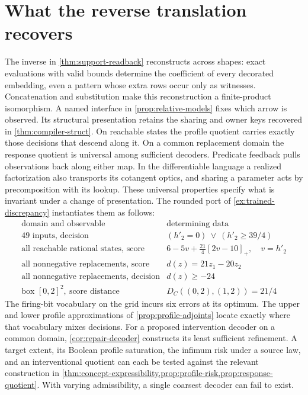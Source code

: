\documentclass[11pt,a4paper]{article}
\theoremstyle{definition}
\theoremstyle{remark}\newaliascnt{remark}{theorem}
\numberwithin{equation}{section}
\begin{document}
\section*{What the reverse translation recovers}
The inverse in \cref{thm:support-readback} reconstructs across shapes: exact evaluations with valid bounds determine the coefficient of every decorated embedding, even a pattern whose extra rows occur only as witnesses. Concatenation and substitution make this reconstruction a finite-product isomorphism. A named interface in \cref{prop:relative-models} fixes which arrow is observed. Its structural presentation retains the sharing and owner keys recovered in \cref{thm:compiler-struct}. On reachable states the profile quotient carries exactly those decisions that descend along it. On a common replacement domain the response quotient is universal among sufficient decoders. Predicate feedback pulls observations back along either map. In the differentiable language a realized factorization also transports its cotangent optics, and sharing a parameter acts by precomposition with its lookup. These universal properties specify what is invariant under a change of presentation. The rounded port of \cref{ex:trained-discrepancy} instantiates them as follows:
\[
\begin{array}{l|l}
 \text{domain and observable}&\text{determining data}\\ \hline
 \text{49 inputs, decision}&(h'_2=0)\ \vee\ (h'_2\ge39/4)\\
 \text{all reachable rational states, score}&
          6-5v+\tfrac{21}{4}[2v-10]_+,\quad v=h'_2\\
 \text{all nonnegative replacements, score}&d(z)=21z_1-20z_2\\
 \text{all nonnegative replacements, decision}&d(z)\ge-24\\

 \text{box }[0,2]^2,\ \text{score distance}&
       D_C((0,2),(1,2))=21/4
\end{array}
\]
The firing-bit vocabulary on the grid incurs six errors at its optimum. The upper and lower profile approximations of \cref{prop:profile-adjoints} locate exactly where that vocabulary mixes decisions. For a proposed intervention decoder on a common domain, \cref{cor:repair-decoder} constructs its least sufficient refinement. A target extent, its Boolean profile saturation, the infimum risk under a source law, and an interventional quotient can each be tested against the relevant construction in \cref{thm:concept-expressibility,prop:profile-risk,prop:response-quotient}. With varying admissibility, a single coarsest decoder can fail to exist.
\end{document}
